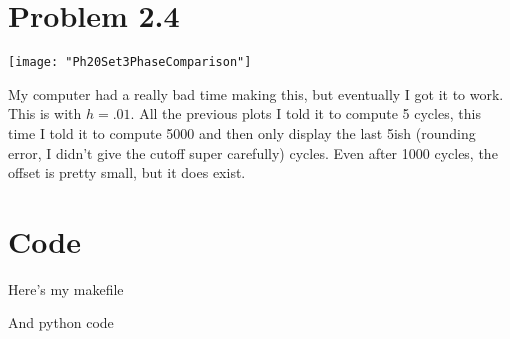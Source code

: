 \documentclass[12pt]{article}
\begin{document}
	\section*{Problem 2.4}
		\begin{center}
			\texttt{[image: "Ph20Set3PhaseComparison"]}
		\end{center}
		My computer had a really bad time making this, but eventually I got it to work. This is with $h=.01$. All the previous plots I told it to compute 5 cycles, this time I told it to compute 5000 and then only display the last 5ish (rounding error, I didn't give the cutoff super carefully) cycles. Even after 1000 cycles, the offset is pretty small, but it does exist. \pagebreak
	\section*{Code}
		\centering Here's my makefile
		
		\centering And python code
		
\end{document}
